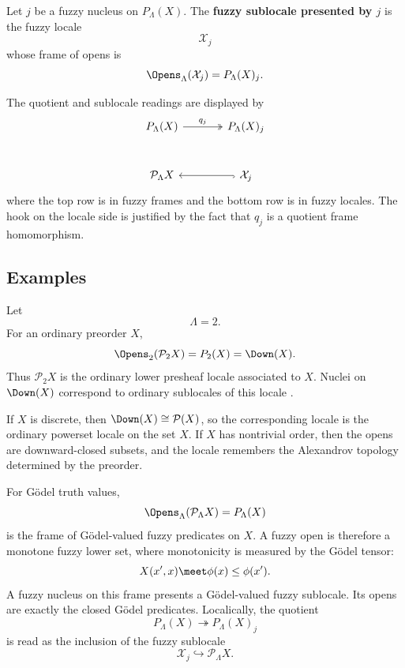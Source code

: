 \begin{definition}
\label{def:fuzzy-sublocale-presented-by-nucleus}
Let \(j\) be a fuzzy nucleus on \(P_\Lambda(X)\). The \textbf{fuzzy sublocale
presented by \(j\)} is the fuzzy locale
\[
    \mathcal X_j
\]
whose frame of opens is
\[
    \Opens_\Lambda(\mathcal X_j)
    =
    P_\Lambda(X)_j.
\]
\end{definition}

The quotient and sublocale readings are displayed by
\[
\begin{tikzcd}[column sep=large, row sep=large]
P_\Lambda(X)
    \arrow[r, two heads, "q_j"]
&
P_\Lambda(X)_j
\\
\mathcal P_\Lambda X
&
\mathcal X_j
    \arrow[l, hook]
\end{tikzcd}
\]
where the top row is in fuzzy frames and the bottom row is in fuzzy locales. The hook
on the locale side is justified by the fact that \(q_j\) is a quotient frame
homomorphism.

\subsection{Examples}
\label{subsec:fuzzy-locale-examples}

\begin{example}
\label{ex:ordinary-presheaf-locales}
Let
\[
    \Lambda=2.
\]
For an ordinary preorder \(X\),
\[
    \Opens_2(\mathcal P_2X)
    =
    P_2(X)
    =
    \Down(X).
\]
Thus \(\mathcal P_2X\) is the ordinary lower presheaf locale associated to \(X\).
Nuclei on \(\Down(X)\) correspond to ordinary sublocales of this locale
\cite{Johnstone1982}.

If \(X\) is discrete, then \(\Down(X)\cong \mathcal P(X)\), so the corresponding
locale is the ordinary powerset locale on the set \(X\). If \(X\) has nontrivial
order, then the opens are downward-closed subsets, and the locale remembers the
Alexandrov topology determined by the preorder.
\end{example}

\begin{example}
\label{ex:godel-valued-presheaf-locales}
For G\"odel truth values,
\[
    \Opens_\Lambda(\mathcal P_\Lambda X)
    =
    P_\Lambda(X)
\]
is the frame of G\"odel-valued fuzzy predicates on \(X\). A fuzzy open is therefore a
monotone fuzzy lower set, where monotonicity is measured by the G\"odel tensor:
\[
    X(x',x)\meet\phi(x)\leq \phi(x').
\]
A fuzzy nucleus on this frame presents a G\"odel-valued fuzzy sublocale. Its opens are
exactly the closed G\"odel predicates. Localically, the quotient
\[
    P_\Lambda(X)\twoheadrightarrow P_\Lambda(X)_j
\]
is read as the inclusion of the fuzzy sublocale
\[
    \mathcal X_j\hookrightarrow \mathcal P_\Lambda X.
\]
\end{example}

